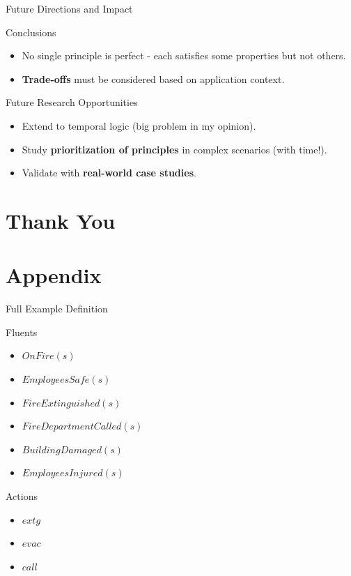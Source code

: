 \documentclass[compress,xcolor=table]{beamer}
\begin{document}
\begin{frame}{Future Directions and Impact}
    \begin{block}{Conclusions}
        \begin{itemize}
            \item No single principle is perfect - each satisfies some properties but not others.
            \item \textbf{Trade-offs} must be considered based on application context.
        \end{itemize}
    \end{block}

    \begin{block}{Future Research Opportunities}
        \begin{itemize}
            \item Extend to temporal logic (big problem in my opinion).
            \item Study \textbf{prioritization of principles} in complex scenarios (with time!).
            \item Validate with \textbf{real-world case studies}.
        \end{itemize}
    \end{block}
\end{frame}

\section{Thank You}

\section{Appendix}

\begin{frame}{Full Example Definition}
    \begin{block}{Fluents}
        \begin{itemize}
            \item $OnFire(s)$
            \item $EmployeesSafe(s)$
            \item $FireExtinguished(s)$
            \item $FireDepartmentCalled(s)$
            \item $BuildingDamaged(s)$
            \item $EmployeesInjured(s)$
        \end{itemize}
    \end{block}

    \begin{block}{Actions}
    \begin{itemize}
        \item $extg$
        \item $evac$
        \item $call$
    \end{itemize}
    \end{block}
\end{frame}
\end{document}
